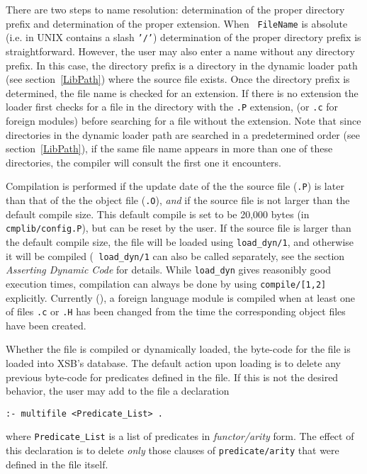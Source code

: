 There are two steps to name resolution: determination of the proper
directory prefix and determination of the proper extension.  When {\tt
FileName} is absolute (i.e. in UNIX contains a slash {\tt '/'})
determination of the proper directory prefix is straightforward.
However, the user may also enter a name without any directory
prefix. In this case, the directory prefix is a directory in the
dynamic loader path (see section~\ref{LibPath}) where the source file
exists.  Once the directory prefix is determined, the file name is
checked for an extension.  If there is no extension the loader first
checks for a file in the directory with the {\tt .P} extension, (or
{\tt .c} for foreign modules) before searching for a file without the
extension.  Note that since directories in the dynamic loader path are
searched in a predetermined order (see section~\ref{LibPath}), if the
same file name appears in more than one of these directories, the
compiler will consult the first one it encounters.

Compilation is performed if the update date of the the source file
({\tt *.P}) is later than that of the the object file ({\tt *.O}),
{\em and} if the source file is not larger than the default compile
size.  This default compile is set to be 20,000 bytes (in {\tt
cmplib/config.P}), but can be reset by the user.  If the source file
is larger than the default compile size, the file will be loaded using
{\tt load\_dyn/1}, and otherwise it will be compiled ({\tt
load\_dyn/1} can also be called separately, see the section {\it
Asserting Dynamic Code} for details.
While {\tt load\_dyn} gives reasonibly good execution times,
compilation can always be done by using {\tt compile/[1,2]}
explicitly.  Currently (\version), a foreign language module is
compiled when at least one of files {\tt *.c} or {\tt *.H} has been
changed from the time the corresponding object files have been
created.

Whether the file is compiled or dynamically loaded, the byte-code for
the file is loaded into XSB's database.  The default action upon
loading is to delete any previous byte-code for predicates defined in
the file.  If this is not the desired behavior, the user may add to
the file a declaration 
\begin{center}
{\tt :- multifile <Predicate\_List> .} \\
\end{center}
where {\tt Predicate\_List} is a list of predicates in {\em
functor/arity} form.  The effect of this declaration is to delete {\em
only} those clauses of {\tt predicate/arity} that were defined in the
file itself.

